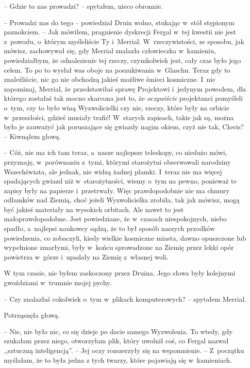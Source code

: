 \documentclass[oneside,polish,11pt,sfheadings]{mwbk}
\begin{document}
-- Gdzie to nas prowadzi? -- spytałem, nieco obronnie.

-- Prowadzi nas do tego -- powiedział Druin wolno, stukając w~stół
stępionym paznokciem. -- Jak mówiłem, pragnienie dyskrecji Fergal w~tej
kwestii nie jest z~powodu, o~którym myśleliście Ty i~Merrial. W~rzeczywistości, ze sposobu, jak mówisz, zachowywał się, gdy Merrial
znalazła człowieczka w~kamieniu, powiedziałbym, że odnalezienie tej
rzeczy, czymkolwiek jest, cały czas było jego celem. To po to wysłał was
oboje na poszukiwania w~Glaschu. Teraz gdy to znaleźliście, nic go nie
obchodzą jakieś możliwe śmieci kosmiczne. I~nie zapominaj, Merrial, że
przedstawiłaś sprawę Projektowi i~jedynym powodem, dla którego zostałaś
tak mocno skarcona jest to, że \textit{oczywiście} projektanci pomyśleli o~tym, czy to było winą Wyzwolicielki czy nie, rzeczy, które były na
orbicie w~przeszłości, gdzieś musiały trafić! W~starych zapisach, takie
jak są, można było je zauważyć jak poruszające się gwiazdy nagim okiem,
czyż nie tak, Clovis? -- Kiwnąłem głową.

-- Cóż, nie ma ich tam teraz, a~nasze najlepsze teleskopy, co niedużo
mówi, przyznaję, w~porównaniu z~tymi, którymi starożytni obserwowali
narodziny Wszechświata, ale jednak, nie widzą żadnej plamki. I~teraz nie
ma więcej spadających gwiazd niż w~starożytności, wiemy o~tym na pewno,
ponieważ te zapisy były na papierze i~przetrwały. Więc prawdopodobnie
nie ma chmury odłamków nad Ziemią, choć jeżeli Wyzwolicielka zrobiła,
tak jak mówisz, mogą być jakieś materiały na wysokich orbitach. Ale
nawet to jest małoprawdopodobne. Jest powiedziane, że w~czasach
niespokojnych, niebo spadło, a~najlepsi naukowcy sądzą, że to był sposób
naszych przodków powiedzenia, co zobaczyli, kiedy wielkie kosmiczne
miasta, dawno opuszczone lub wypełnione zmarłymi, były w~końcu
sprowadzone na Ziemię przez lekki opór powietrza w~górze i~upadały na
Ziemię z~własnej woli.

W tym czasie, nie byłem zaskoczony przez Druina. Jego słowa były
kolejnymi gwoździami w~trumnie mojej pychy.

-- Czy znalazłaś cokolwiek o~tym w~plikach komputerowych? -- spytałem
Merrial.

Potrząsnęła głową. 

-- Nie, nie było nic, co się dzieje po dacie samego
Wyzwolenia. To wtedy, gdy szukałam przez niego, otworzyłam plik, który
uwolnił coś, co Fergal nazwał ,,sztuczną inteligencją''. -- Jej oczy
rozszerzyły się na wspomnienie. -- Z~początku myślałam, że to była jedna
z tych twarzy, które pojawiają się w~kamieniach.
\end{document}
